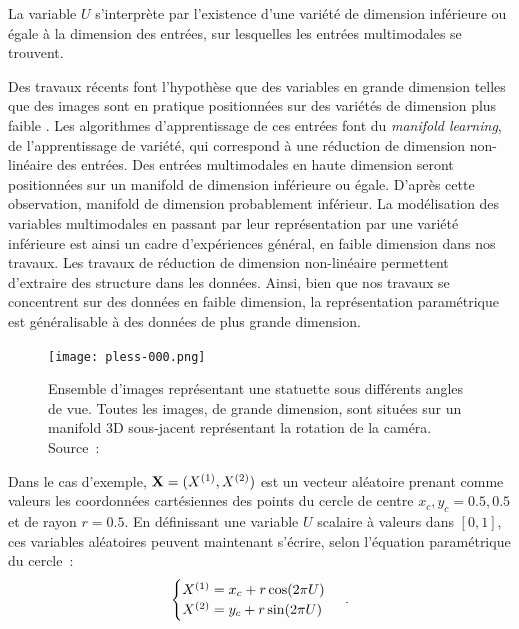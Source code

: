 \documentclass[../main]{subfiles}
\begin{document}
La variable $U$ s'interprète par l'existence d'une variété de dimension inférieure ou égale à la dimension des entrées, sur lesquelles les entrées multimodales se trouvent.

Des travaux récents font l'hypothèse que des variables en grande dimension telles que des images sont en pratique positionnées sur des variétés de dimension plus faible \cite{Pless2009ASO}.
Les algorithmes d'apprentissage de ces entrées font du \emph{manifold learning}, de l'apprentissage de variété, qui correspond à une réduction de dimension non-linéaire des entrées.
Des entrées multimodales en haute dimension seront positionnées sur un manifold de dimension inférieure ou égale. D'après cette observation, manifold de dimension probablement inférieur.
La modélisation des variables multimodales en passant par leur représentation par une variété inférieure est ainsi un cadre d'expériences général, en faible dimension dans nos travaux.
Les travaux de réduction de dimension non-linéaire permettent d'extraire des structure dans les données.
Ainsi, bien que nos travaux se concentrent sur des données en faible dimension, la représentation paramétrique est généralisable à des données de plus grande dimension.
\begin{figure}
    \centering
    \texttt{[image: pless-000.png]}
    \caption{Ensemble d'images représentant une statuette sous différents angles de vue. Toutes les images, de grande dimension, sont situées sur un manifold 3D sous-jacent représentant la rotation de la caméra. Source~:~\cite{Pless2009ASO}}
\end{figure}


Dans le cas d'exemple, $\mathbf{X} = (X^{({1})},X^{({2})})$ est un vecteur aléatoire prenant comme valeurs les coordonnées cartésiennes des points du cercle de centre $x_c,y_c = 0.5,0.5$ et de rayon $r = 0.5$.
En définissant une variable $U$ scalaire à valeurs dans $[0,1]$, ces variables aléatoires peuvent maintenant s'écrire, selon l'équation paramétrique du cercle~:
\begin{equation}
 \begin{cases}
     X^{({1})}= x_c + r  \cos(2\pi U)\\
     X^{({2})} = y_c + r \sin(2 \pi U)
    \end{cases}\,.
\end{equation}
\end{document}
